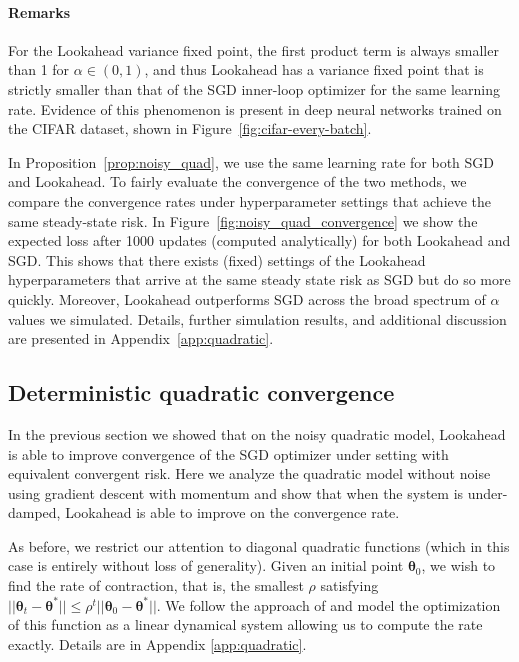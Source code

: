 \documentclass{article}
\newcommand{\btheta}{\boldsymbol{\theta}}
\begin{document}
\paragraph{Remarks}For the Lookahead variance fixed point, the first product term is always smaller than 1 for $\alpha \in (0,1)$, and thus Lookahead has a variance fixed point that is strictly smaller than that of the SGD inner-loop optimizer for the same learning rate. Evidence of this phenomenon is present in deep neural networks trained on the CIFAR dataset, shown in Figure~\ref{fig:cifar-every-batch}.



In Proposition~\ref{prop:noisy_quad}, we use the same learning rate for both SGD and Lookahead. To fairly evaluate the convergence of the two methods, we compare the convergence rates under hyperparameter settings that achieve the same steady-state risk. In Figure~\ref{fig:noisy_quad_convergence} we show the expected loss after 1000 updates (computed analytically) for both Lookahead and SGD. This shows that there exists (fixed) settings of the Lookahead hyperparameters that arrive at the same steady state risk as SGD but do so more quickly. Moreover, Lookahead outperforms SGD across the broad spectrum of $\alpha$ values we simulated. Details, further simulation results, and additional discussion are presented in Appendix~\ref{app:quadratic}.



 \subsection{Deterministic quadratic convergence}

In the previous section we showed that on the noisy quadratic model, Lookahead is able to improve convergence of the SGD optimizer under setting with equivalent convergent risk. Here we analyze the quadratic model without noise using gradient descent with momentum \citep{polyak1964some, goh2017why} and show that when the system is under-damped, Lookahead is able to improve on the convergence rate.

As before, we restrict our attention to diagonal quadratic functions (which in this case is entirely without loss of generality). Given an initial point $\btheta_0$, we wish to find the rate of contraction, that is, the smallest $\rho$ satisfying $||\btheta_t - \btheta^*|| \leq \rho^t ||\btheta_{0} - \btheta^*||$. We follow the approach of \citep{o2015adaptive} and model the optimization of this function as a linear dynamical system allowing us to compute the rate exactly. Details are in Appendix \ref{app:quadratic}.
\end{document}
